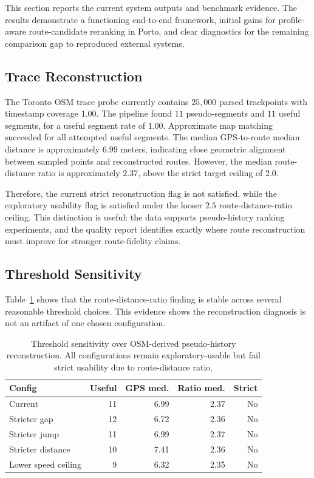 This section reports the current system outputs and benchmark evidence. The results demonstrate a functioning end-to-end framework, initial gains for profile-aware route-candidate reranking in Porto, and clear diagnostics for the remaining comparison gap to reproduced external systems.

\subsection{Trace Reconstruction}
The Toronto OSM trace probe currently contains $25{,}000$ parsed trackpoints with timestamp coverage $1.00$. The pipeline found $11$ pseudo-segments and $11$ useful segments, for a useful segment rate of $1.00$. Approximate map matching succeeded for all attempted useful segments. The median GPS-to-route median distance is approximately $6.99$ meters, indicating close geometric alignment between sampled points and reconstructed routes. However, the median route-distance ratio is approximately $2.37$, above the strict target ceiling of $2.0$.

Therefore, the current strict reconstruction flag is not satisfied, while the exploratory usability flag is satisfied under the looser $2.5$ route-distance-ratio ceiling. This distinction is useful: the data supports pseudo-history ranking experiments, and the quality report identifies exactly where route reconstruction must improve for stronger route-fidelity claims.

\subsection{Threshold Sensitivity}
Table~\ref{tab:threshold_sensitivity} shows that the route-distance-ratio finding is stable across several reasonable threshold choices. This evidence shows the reconstruction diagnosis is not an artifact of one chosen configuration.

\begin{table}[t]
  \centering
  \caption{Threshold sensitivity over OSM-derived pseudo-history reconstruction. All configurations remain exploratory-usable but fail strict usability due to route-distance ratio.}
  \label{tab:threshold_sensitivity}
  \begin{tabular}{lrrrr}
    \toprule
    Config & Useful & GPS med. & Ratio med. & Strict \\
    \midrule
    Current & 11 & 6.99 & 2.37 & No \\
    Stricter gap & 12 & 6.72 & 2.36 & No \\
    Stricter jump & 11 & 6.99 & 2.37 & No \\
    Stricter distance & 10 & 7.41 & 2.36 & No \\
    Lower speed ceiling & 9 & 6.32 & 2.35 & No \\
    \bottomrule
  \end{tabular}
\end{table}

